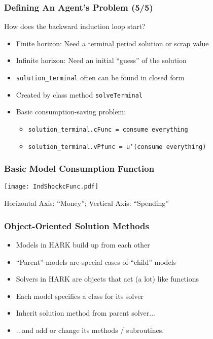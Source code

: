\documentclass[11ptt]{beamer}
\newcommand{\bi}{\begin{itemize}}
\newcommand{\ei}{\end{itemize}}
\begin{document}
\begin{frame}
\frametitle{Defining An Agent's Problem (5/5)}

How does the backward induction loop start?
\bi
\item <1->Finite horizon: Need a terminal period solution or scrap value

\item <1->Infinite horizon: Need an initial ``guess'' of the solution

\item <2->\texttt{solution\_terminal} often can be found in closed form

\item <2->Created by class method \texttt{solveTerminal}

\item <3->Basic consumption-saving problem:
\bi
\item \texttt{solution\_terminal.cFunc = consume everything}

\item \texttt{solution\_terminal.vPfunc = u'(consume everything)}
\ei
\ei
\end{frame}


\begin{frame}
\frametitle{Basic Model Consumption Function}
\begin{center}
  \texttt{[image: IndShockcFunc.pdf]}
\end{center}
\centerline{Horizontal Axis: ``Money''; Vertical Axis: ``Spending''}
\end{frame}


\begin{frame}
\frametitle{Object-Oriented Solution Methods}
\begin{itemize}
\item <1->Models in HARK build up from each other

\item <1->``Parent'' models are special cases of ``child'' models

\item <2->Solvers in HARK are objects that act (a lot) like functions

\item <2->Each model specifies a class for its solver

\item <2->Inherit solution method from parent solver...

\item <2->...and add or change its methods / subroutines.
\end{itemize}
\end{frame}
\end{document}

